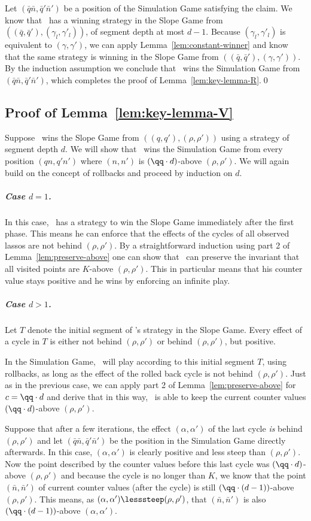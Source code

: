 Let $(\bar q \bar n, \bar q' \bar n')$ be a position of the Simulation Game satisfying the claim.
We know that \R\ has a winning strategy in the Slope Game from $((\bar q, \bar q'),
(\gamma_l,\gamma'_l))$, of segment depth at most $d-1$.
Because $(\gamma_l,\gamma'_l)$ is equivalent to $(\gamma,\gamma')$, we can apply
Lemma~\ref{lem:constant-winner} and know that the same strategy is winning in the
Slope Game from $((\bar q, \bar q'), (\gamma, \gamma'))$.
By the induction assumption we conclude that \R\ wins the Simulation Game
from $(\bar q \bar n, \bar q' \bar n')$, which completes the proof of
Lemma~\ref{lem:key-lemma-R}.\qed



\subsection{Proof of Lemma~\ref{lem:key-lemma-V}}  \label{sec:proof-V}

Suppose \V\ wins the Slope Game from $((q,q'), (\rho, \rho'))$ using a strategy of segment depth $d$.
We will show that \V\ wins the Simulation Game from every position $(q n, q' n')$ where
$(n,n')$ is $(\qq \cdot d)$-above $(\rho,\rho')$.
We will again build on the concept of rollbacks and proceed by induction on $d$.

\subparagraph*{Case $d = 1$.} 
In this case, \V\ has a strategy to win the Slope Game immediately after the first phase.
This means he can enforce that the effects of the cycles of all observed lassos are not behind
$(\rho,\rho')$.
By a straightforward induction using part 2 of Lemma~\ref{lem:preserve-above}
one can show that \V\ can preserve the invariant that all visited points
are $K$-above $(\rho,\rho')$. This in particular means that
his counter value stays positive and he wins by enforcing an infinite play.

\subparagraph*{Case $d > 1$.} 
Let $T$ denote the initial segment of \V's strategy in the Slope Game.
Every effect of a cycle in $T$ is either not behind $(\rho,\rho')$ or behind
$(\rho,\rho')$, but positive.

In the Simulation Game, \V\ will play according to this initial segment $T$, using
rollbacks, as long as the effect of the rolled back cycle is not behind
$(\rho,\rho')$.
Just as in the previous case, we can apply part 2 of Lemma~\ref{lem:preserve-above}
for $c = \qq\cdot d$ and derive that in this way, \V\ is able to keep the current
counter values $(\qq\cdot d)$-above $(\rho,\rho')$.
 
Suppose that after a few iterations, the effect $(\alpha,\alpha')$ of 
the last cycle \emph{is} behind $(\rho,\rho')$ and let $(\bar q \bar n, \bar q' \bar n')$ be the
position in the Simulation Game directly afterwards.
In this case, $(\alpha, \alpha')$ is clearly positive and less steep than
$(\rho,\rho')$.
Now the point described by the counter values before this last cycle was $(\qq\cdot
d)$-above $(\rho,\rho')$ and because the cycle is no longer than $K$, we know that the
point $(\bar n, \bar n')$ of current counter values (after the cycle) is still
$(\qq\cdot(d-1))$-above $(\rho,\rho')$.
This means, as $(\alpha, \alpha')\lesssteep(\rho,\rho')$,
that $(\bar n, \bar n')$ is also $(\qq\cdot(d-1))$-above $(\alpha,\alpha')$.

